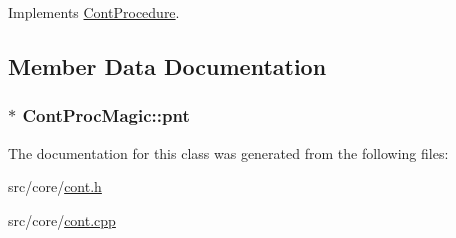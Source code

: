Implements \hyperlink{a00067_a7f7adefe250a00b3778669ef649f03ac}{Cont\-Procedure}.



\subsection{Member Data Documentation}
\hypertarget{a00076_aeddee0118a33add02ef57c4811439b12}{
\subsubsection[{pnt}]{$\ast$ Cont\-Proc\-Magic\-::pnt\hspace{0.3cm}{\ttfamily [private]}}}\label{a00076_aeddee0118a33add02ef57c4811439b12}


The documentation for this class was generated from the following files\-:\begin{DoxyCompactItemize}
\item 
src/core/\hyperlink{a00218}{cont.\-h}\item 
src/core/\hyperlink{a00217}{cont.\-cpp}\end{DoxyCompactItemize}
